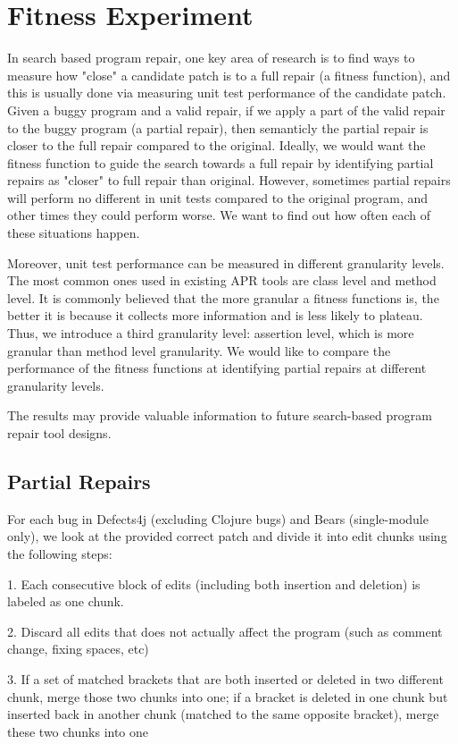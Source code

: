 \documentclass[sigconf, timestamp-false, anonymous=true]{acmart}
\begin{document}
\section{Fitness Experiment}

In search based program repair, one key area of research is to find ways to measure how "close" a candidate patch is to a full repair (a fitness function),
and this is usually done via measuring unit test performance of the candidate patch. 
Given a buggy program and a valid repair, if we apply a part of the valid repair to the buggy program (a partial repair), then semanticly the partial repair is closer to the full repair compared to the original. 
Ideally, we would want the fitness function to guide the search towards a full repair by identifying partial repairs as "closer" to full repair than original.
However, sometimes partial repairs will perform no different in unit tests compared to the original program, and other times they could perform worse. We want to find out how often each of these situations happen.

Moreover, unit test performance can be measured in different granularity levels. The most common ones used in existing APR tools are class level and method level. 
It is commonly believed that the more granular a fitness functions is, the better it is because it collects more information and is less likely to plateau. Thus, we introduce a third granularity level: assertion level, which is more granular than method level granularity.
We would like to compare the performance of the fitness functions at identifying partial repairs at different granularity levels.

The results may provide valuable information to future search-based program repair tool designs.

\subsection{Partial Repairs}

For each bug in Defects4j (excluding Clojure bugs) and Bears (single-module only), we look at the provided correct patch and divide it into edit chunks using the following steps:

1. Each consecutive block of edits (including both insertion and deletion) is labeled as one chunk.

2. Discard all edits that does not actually affect the program (such as comment change, fixing spaces, etc)

3. If a set of matched brackets that are both inserted or deleted in two different chunk, merge those two chunks into one; if a bracket is deleted in one chunk but inserted back in another chunk (matched to the same opposite bracket), merge these two chunks into one
\end{document}
